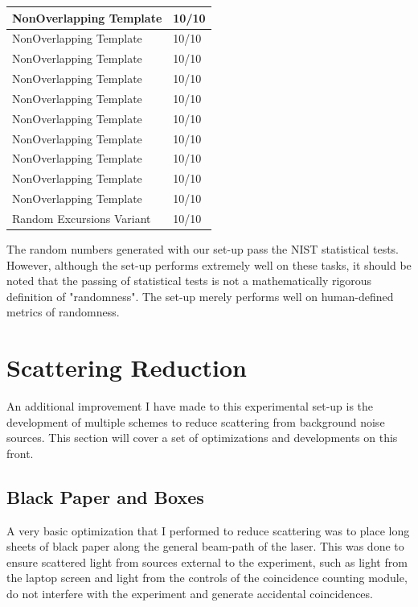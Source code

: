 \documentclass[letterpaper, 11 pt]{book}
\begin{document}
\begin{table}[H]
\begin{tabular}{|l|l|}
NonOverlapping Template   & 10/10      \\\hline
NonOverlapping Template   & 10/10      \\\hline
NonOverlapping Template   & 10/10      \\\hline
NonOverlapping Template   & 10/10      \\\hline
NonOverlapping Template   & 10/10      \\\hline
NonOverlapping Template   & 10/10      \\\hline
NonOverlapping Template   & 10/10      \\\hline
NonOverlapping Template   & 10/10      \\\hline
NonOverlapping Template   & 10/10      \\\hline
NonOverlapping Template   & 10/10      \\\hline
Random Excursions Variant & 10/10      \\\hline
\end{tabular}
\end{table}
\label{tab:rng_test}

The random numbers generated with our set-up pass the NIST statistical tests.
However, although the set-up performs extremely well on these tasks, it should
be noted that the passing of statistical tests is not a mathematically rigorous
definition of "randomness". The set-up merely performs well on human-defined
metrics of randomness.

\section{Scattering Reduction}
An additional improvement I have made to this experimental set-up is the
development of multiple schemes to reduce scattering from background noise
sources. This section will cover a set of optimizations and developments on this
front.

\subsection{Black Paper and Boxes}

A very basic optimization that I performed to reduce scattering was to place
long sheets of black paper along the general beam-path of the laser. This was
done to ensure scattered light from sources external to the experiment, such as
light from the laptop screen and light from the controls of the coincidence
counting module, do not interfere with the experiment and generate accidental
coincidences.
\end{document}

